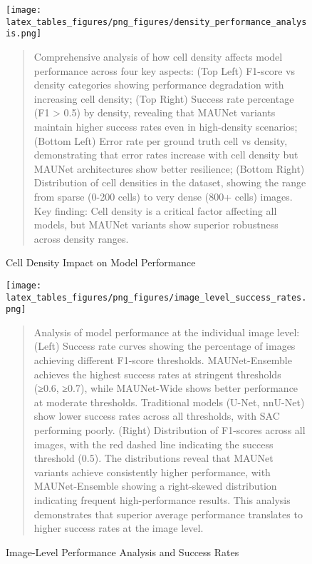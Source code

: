 
\begin{figure}[htbp]
\centering
\texttt{[image: latex\_tables\_figures/png\_figures/density\_performance\_analysis.png]}
\caption{Cell Density Impact on Model Performance}
\label{fig:density_performance_analysis}
\begin{quote}
\small
Comprehensive analysis of how cell density affects model performance across four key aspects: (Top Left) F1-score vs density categories showing performance degradation with increasing cell density; (Top Right) Success rate percentage (F1 > 0.5) by density, revealing that MAUNet variants maintain higher success rates even in high-density scenarios; (Bottom Left) Error rate per ground truth cell vs density, demonstrating that error rates increase with cell density but MAUNet architectures show better resilience; (Bottom Right) Distribution of cell densities in the dataset, showing the range from sparse (0-200 cells) to very dense (800+ cells) images. Key finding: Cell density is a critical factor affecting all models, but MAUNet variants show superior robustness across density ranges.
\end{quote}
\end{figure}

\begin{figure}[htbp]
\centering
\texttt{[image: latex\_tables\_figures/png\_figures/image\_level\_success\_rates.png]}
\caption{Image-Level Performance Analysis and Success Rates}
\label{fig:image_level_success_rates}
\begin{quote}
\small
Analysis of model performance at the individual image level: (Left) Success rate curves showing the percentage of images achieving different F1-score thresholds. MAUNet-Ensemble achieves the highest success rates at stringent thresholds (≥0.6, ≥0.7), while MAUNet-Wide shows better performance at moderate thresholds. Traditional models (U-Net, nnU-Net) show lower success rates across all thresholds, with SAC performing poorly. (Right) Distribution of F1-scores across all images, with the red dashed line indicating the success threshold (0.5). The distributions reveal that MAUNet variants achieve consistently higher performance, with MAUNet-Ensemble showing a right-skewed distribution indicating frequent high-performance results. This analysis demonstrates that superior average performance translates to higher success rates at the image level.
\end{quote}
\end{figure}

